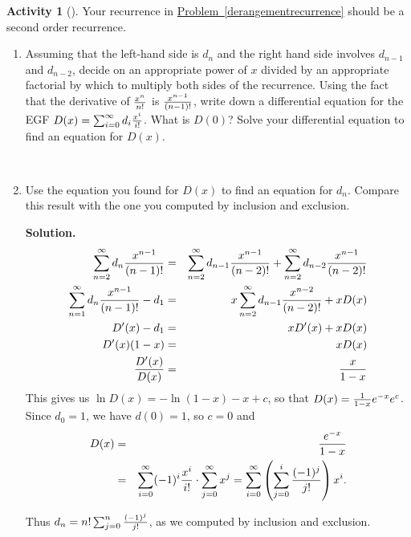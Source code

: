 \documentclass[10pt,]{book}
\theoremstyle{plain}
\theoremstyle{definition}
\newtheorem{activity}[project]{Activity}
\numberwithin{equation}{chapter}
\newcommand{\amp}{&}
\begin{document}
\begin{activity}[]\label{exponentialderangements}
Your recurrence in \hyperref[derangementrecurrence]{Problem~\ref{derangementrecurrence}} should be a second order recurrence.%
~\par
\begin{enumerate}[label=(\alph*)]
 \item Assuming that the left-hand side is \(d_n\) and the right hand side involves \(d_{n-1}\) and \(d_{n-2}\), decide on an appropriate power of \(x\) divided by an appropriate factorial by which to multiply both sides of the recurrence.  Using the fact that the derivative of \(x^n\over n!\) is \(x^{n-1}\over (n-1)!\), write down a differential equation for the EGF \(D(x) =
\sum_{i=0}^\infty d_i{x^i\over i!}\). What is \(D(0)\)?  Solve your differential equation to find an equation for \(D(x)\).%

~\par
\item Use the equation you found for \(D(x)\) to find an equation for \(d_n\).  Compare this result with the one you computed by inclusion and exclusion.%
\par\medskip\noindent%
\textbf{Solution.}\quad %
\begin{align*}
\sum_{n=2}^\infty d_n{x^{n-1}\over (n-1)!}
\amp =\amp \sum_{n=2}^\infty d_{n-1}{x^{n-1} \over (n-2)!} +\sum_{n=2}^\infty
d_{n-2}{x^{n-1}
\over (n-2)!}\\
\sum_{n=1}^\infty d_n{x^{n-1}\over (n-1)!} -d_1 \amp =\amp
x\sum_{n=2}^\infty d_{n-1}{x^{n-2}\over (n-2)!} +xD(x)\\
D'(x) -d_1 \amp =\amp  xD'(x) +xD(x)\\
D'(x)(1-x) \amp =\amp  xD(x)\\
D'(x)\over D(x) \amp =\amp  x\over 1-x
\end{align*}
This gives us \(\ln D(x) = -\ln(1-x) -x +c\), so that \(D(x) = {1\over
1-x}e^{-x}e^c\). Since \(d_0=1\), we have \(d(0)=1\), so \(c=0\) and%
\begin{align*}
D(x) \amp =\amp  {e^{-x}\over 1-x}\\
\amp =\amp
\sum_{i=0}^\infty(-1)^i{x^i\over i!}\cdot\sum_{j=0}^\infty
x^j=\sum_{i=0}^\infty\left(\sum_{j=0}^i {(-1)^j\over j!}\right)
x^i.
\end{align*}
%
\par
Thus \(d_n = n!\sum_{j=0}^n{(-1)^j\over j!}\), as we computed by inclusion and exclusion.%

\end{enumerate}
\end{activity}
\typeout{************************************************}
\typeout{************************************************}
\end{document}
